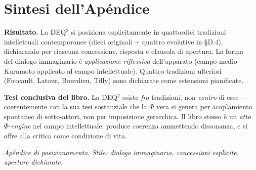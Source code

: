 \section{Sintesi dell'Apéndice}\label{sintesi-dellapéndice}

\Proved{} \textbf{Risultato.} La DEQ$^2$ si posiziona esplicitamente in
quattordici tradizioni intellettuali contemporanee (dieci originali +
quattro evolutive in §D.4), dichiarando per ciascuna concessione, risposta
e clausola di apertura. La forma del dialogo immaginario è
\emph{applicazione riflessiva} dell'apparato (campo medio Kuramoto
applicato al campo intellettuale). Quattro tradizioni ulteriori (Foucault,
Latour, Bourdieu, Tilly) sono dichiarate come estensioni pianificate.

\Hypoth{} \textbf{Tesi conclusiva del libro.} La DEQ$^2$ esiste \emph{fra}
tradizioni, non \emph{contro} di esse --- coerentemente con la sua tesi
sostanziale che la \(\Phi\) vera si genera per acoplamiento spontaneo
di sotto-attori, non per imposizione gerarchica. Il libro stesso è un
\emph{atto \(\Phi\)-engine} nel campo intellettuale: produce coerenza
ammettendo dissonanza, e si offre alla critica come condizione di vita.



\emph{Apéndice di posizionamento. Stile: dialogo immaginario,
concessioni esplicite, aperture dichiarate.}
